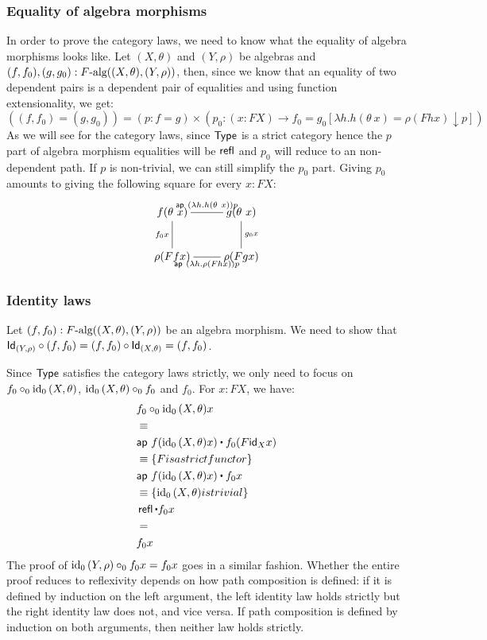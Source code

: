 \documentclass[a4paper,10pt]{article}
\begin{document}
\subsubsection{Equality of algebra morphisms}

In order to prove the category laws, we need to know what the equality
of algebra morphisms looks like. Let $(X,\theta)$ and $(Y, \rho)$ be
algebras and $(f,f_0) ,(g, g_0) : F\mbox{-alg}((X,\theta),(Y,\rho))$,
then, since we know that an equality of two dependent pairs is a
dependent pair of equalities and using function extensionality, we
get:
$$
((f,f_0) = (g,g_0)) = (p : f = g) \times (p_0 : (x : FX) \to f_0 = g_0 [ \lambda h . h (\theta\ x) = \rho (F h x) \downarrow p ])
$$
As we will see for the category laws, since $\mathsf{Type}$ is a strict
category hence the $p$ part of algebra morphism equalities will be
$\operatorname{\mathsf{refl}}$ and $p_0$ will reduce to an non-dependent path. If $p$ is
non-trivial, we can still simplify the $p_0$ part. Giving $p_0$
amounts to giving the following square for every $x : FX$:
$$
\xymatrix{
f (\theta\ x) \ar@{-}[d]_{f_0 x} \ar@{-}[r]^{\ap\ (\lambda h . h (\theta\ x)) p}  &g (\theta\ x) \ar@{-}[d]^{g_0 x} \\
\rho (F f x) \ar@{-}[r]_{\ap\ (\lambda h . \rho (F h x)) p} &\rho (F g x) }
$$

\subsubsection{Identity laws}

Let $(f , f_0) : F\mbox{-alg}((X,\theta),(Y,\rho))$ be an algebra
morphism. We need to show that
$\mathsf{Id}_{(Y,\rho)} \circ (f , f_0) = (f , f_0) \circ \mathsf{Id}_{(X,\theta)} =
(f,f_0)$.

Since $\mathsf{Type}$ satisfies the category laws strictly, we only need to
focus on $f_0 \circ_0 \operatorname*{id_0}{(X,\theta)}$, $\operatorname*{id_0}{(X,\theta)} \circ_0 f_0$
and $f_0$. For $x : FX$, we have:
%
\begin{align*}
  &f_0 \circ_0 \ido{(X,\theta)} x \\
  &\defeq \\
  &\ap\ f (\ido{(X,\theta)} x) \ct f_0 (F \id{X} x) \\
  &\defeq \{ F is a strict functor \} \\
  &\ap\ f (\ido{(X,\theta)} x) \ct f_0 x \\
  &\defeq \{ \ido{(X,\theta)} is trivial \} \\
  &\refl \ct f_0 x \\
  &= \\
  &f_0 x
\end{align*}
%
The proof of $\operatorname*{id_0}{(Y,\rho)} \circ_0 f_0 x = f_0 x$ goes in a similar
fashion. Whether the entire proof reduces to reflexivity depends on
how path composition is defined: if it is defined by induction on the
left argument, the left identity law holds strictly but the right
identity law does not, and vice versa. If path composition is defined
by induction on both arguments, then neither law holds strictly.
\end{document}
